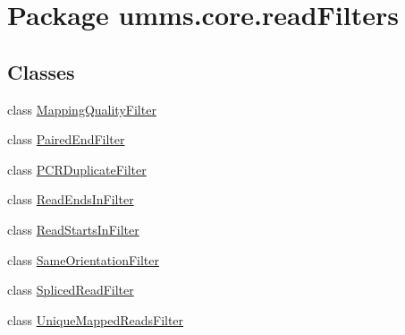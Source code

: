 \hypertarget{namespaceumms_1_1core_1_1read_filters}{\section{Package umms.\+core.\+read\+Filters}
\label{namespaceumms_1_1core_1_1read_filters}
}
\subsection*{Classes}
\begin{DoxyCompactItemize}
\item 
class \hyperlink{classumms_1_1core_1_1read_filters_1_1_mapping_quality_filter}{Mapping\+Quality\+Filter}
\item 
class \hyperlink{classumms_1_1core_1_1read_filters_1_1_paired_end_filter}{Paired\+End\+Filter}
\item 
class \hyperlink{classumms_1_1core_1_1read_filters_1_1_p_c_r_duplicate_filter}{P\+C\+R\+Duplicate\+Filter}
\item 
class \hyperlink{classumms_1_1core_1_1read_filters_1_1_read_ends_in_filter}{Read\+Ends\+In\+Filter}
\item 
class \hyperlink{classumms_1_1core_1_1read_filters_1_1_read_starts_in_filter}{Read\+Starts\+In\+Filter}
\item 
class \hyperlink{classumms_1_1core_1_1read_filters_1_1_same_orientation_filter}{Same\+Orientation\+Filter}
\item 
class \hyperlink{classumms_1_1core_1_1read_filters_1_1_spliced_read_filter}{Spliced\+Read\+Filter}
\item 
class \hyperlink{classumms_1_1core_1_1read_filters_1_1_unique_mapped_reads_filter}{Unique\+Mapped\+Reads\+Filter}
\end{DoxyCompactItemize}
